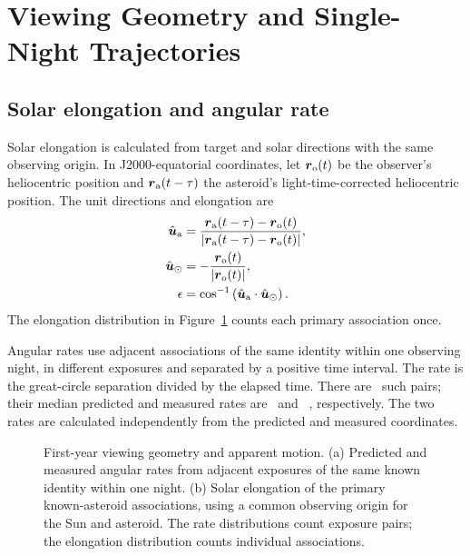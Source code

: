 \appendix
\setcounter{figure}{0}
\renewcommand{\thefigure}{A\arabic{figure}}
\renewcommand{\theHfigure}{A.\arabic{figure}}
\renewcommand{\theHequation}{A.\arabic{equation}}
\section{Viewing Geometry and Single-Night Trajectories}
\label{app:checks}

\subsection{Solar elongation and angular rate}
\label{app:geometry}

Solar elongation is calculated from target and solar directions
with the same observing origin. In J2000-equatorial coordinates,
let $\boldsymbol r_{\rm o}(t)$ be the observer's heliocentric
position and $\boldsymbol r_{\rm a}(t-\tau)$ the asteroid's
light-time-corrected heliocentric position. The unit directions
and elongation are
\begin{align}
\hat{\boldsymbol u}_{\rm a} &=
\frac{\boldsymbol r_{\rm a}(t-\tau)-\boldsymbol r_{\rm o}(t)}
 {|\boldsymbol r_{\rm a}(t-\tau)-\boldsymbol r_{\rm o}(t)|},\\
\hat{\boldsymbol u}_{\odot} &=
-\frac{\boldsymbol r_{\rm o}(t)}{|\boldsymbol r_{\rm o}(t)|},\\
\epsilon &=\cos^{-1}\left(\hat{\boldsymbol u}_{\rm a}\cdot
 \hat{\boldsymbol u}_{\odot}\right).
\end{align}
The elongation distribution in Figure~\ref{fig:geometry} counts
each primary association once.

Angular rates use adjacent associations of the same identity
within one observing night, in different exposures and separated
by a positive time interval. The rate is the great-circle
separation divided by the elapsed time. There are \yrNRatePairs\
such pairs; their median predicted and measured rates are
\yrPredictedRate\ and \yrMeasuredRate~\rateunit, respectively.
The two rates are calculated independently from the predicted
and measured coordinates.

\begin{figure}[htbp]
\centering
{}
\caption{First-year viewing geometry and apparent motion.
(a) Predicted and measured angular rates from adjacent exposures
of the same known identity within one night.
(b) Solar elongation of the primary known-asteroid associations,
using a common observing origin for the Sun and asteroid.
The rate distributions count exposure pairs; the elongation
distribution counts individual associations.}
\label{fig:geometry}
\end{figure}

